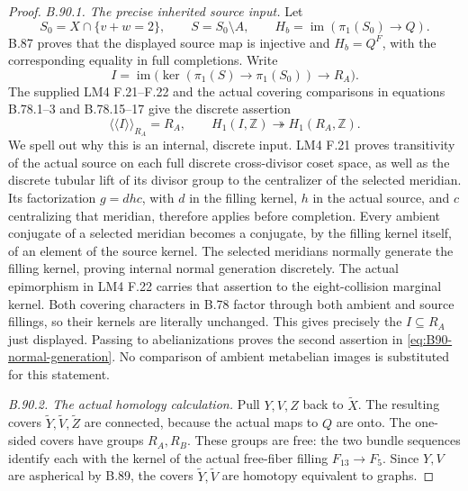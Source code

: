\begin{proof}
\emph{B.90.1. The precise inherited source input.}
Let
\[
 S_0=X\cap\{v+w=2\},\qquad S=S_0\setminus A,
 \qquad H_b=\operatorname{im}(\pi_1(S_0)\to Q).
\]
B.87 proves that the displayed source map is injective and
$H_b=Q^F$, with the corresponding equality in full completions.
Write
\[
 I=\operatorname{im}\bigl(
       \ker(\pi_1(S)\to\pi_1(S_0))\longrightarrow R_A\bigr).
\]
The supplied LM4 F.21--F.22 and the actual covering comparisons in
equations B.78.1--3 and B.78.15--17 give the discrete assertion
\begin{equation}\label{eq:B90-normal-generation}
 \langle\!\langle I\rangle\!\rangle_{R_A}=R_A,
 \qquad H_1(I,\mathbb Z)\twoheadrightarrow H_1(R_A,\mathbb Z).
\end{equation}
We spell out why this is an internal, discrete input. LM4 F.21 proves
transitivity of the actual source on each full discrete cross-divisor
coset space, as well as the discrete tubular lift of its divisor
group to the centralizer of the selected meridian. Its factorization
$g=d h c$, with $d$ in the filling kernel, $h$ in the actual source,
and $c$ centralizing that meridian, therefore applies before
completion. Every ambient conjugate of a selected meridian becomes
a conjugate, by the filling kernel itself, of an element of the
source kernel. The selected meridians normally generate the filling
kernel, proving internal normal generation discretely. The actual
epimorphism in LM4 F.22 carries that assertion to the eight-collision
marginal kernel. Both covering characters in B.78 factor through
both ambient and source fillings, so their kernels are literally
unchanged. This gives precisely the $I\subseteq R_A$ just displayed.
Passing to abelianizations proves the second assertion in
\eqref{eq:B90-normal-generation}. No comparison of ambient
metabelian images is substituted for this statement.

\emph{B.90.2. The actual homology calculation.}
Pull $Y,V,Z$ back to $\widetilde X$. The resulting covers
$\widetilde Y,\widetilde V,\widetilde Z$ are connected, because
the actual maps to $Q$ are onto. The one-sided covers have groups
$R_A,R_B$. These groups are free: the two bundle sequences identify
each with the kernel of the actual free-fiber filling $F_{13}\to F_5$.
Since $Y,V$ are aspherical by B.89, the covers
$\widetilde Y,\widetilde V$ are homotopy equivalent to graphs.


\end{proof}
